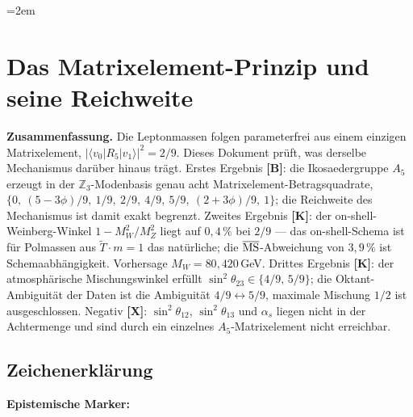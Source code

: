 \providecommand{\BM}{\textbf{[B]}}
\providecommand{\KM}{\textbf{[K]}}
\providecommand{\SM}{\textbf{[S]}}
\providecommand{\EM}{\textbf{[E]}}
\providecommand{\XM}{\textbf{[X]}}

\sloppy
\emergencystretch=2em
\chapter*{Das Matrixelement-Prinzip und seine Reichweite}

{\small\noindent\textbf{Zusammenfassung.}\quad\ignorespaces
Die Leptonmassen folgen parameterfrei aus einem einzigen Matrixelement,
$|\langle v_0|R_5|v_1\rangle|^2 = 2/9$. Dieses Dokument prüft, was derselbe
Mechanismus darüber hinaus trägt. Erstes Ergebnis \BM: die Ikosaedergruppe
$A_5$ erzeugt in der $\mathbb Z_3$-Modenbasis genau acht
Matrixelement-Betragsquadrate, $\{0,\ (5-3\phi)/9,\ 1/9,\ 2/9,\ 4/9,\ 5/9,\
(2+3\phi)/9,\ 1\}$; die Reichweite des Mechanismus ist damit exakt begrenzt.
Zweites Ergebnis \KM: der on-shell-Weinberg-Winkel $1-M_W^2/M_Z^2$ liegt auf
$0{,}4\,\%$ bei $2/9$ --- das on-shell-Schema ist für Polmassen aus
$\tilde T\cdot m=1$ das natürliche; die $\overline{\rm MS}$-Abweichung von
$3{,}9\,\%$ ist Schemaabhängigkeit. Vorhersage $M_W = 80{,}420$\,GeV.
Drittes Ergebnis \KM: der atmosphärische Mischungswinkel erfüllt
$\sin^2\theta_{23}\in\{4/9,\,5/9\}$; die Oktant-Ambiguität der Daten ist die
Ambiguität $4/9\leftrightarrow 5/9$, maximale Mischung $1/2$ ist ausgeschlossen.
Negativ \XM: $\sin^2\theta_{12}$, $\sin^2\theta_{13}$ und $\alpha_s$ liegen
nicht in der Achtermenge und sind durch ein einzelnes $A_5$-Matrixelement
nicht erreichbar.
}\medskip

\section*{Zeichenerklärung}

\medskip
\textbf{Epistemische Marker:}\par\medskip


